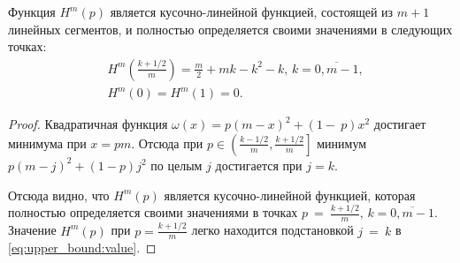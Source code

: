 \begin{lemma}
\label{lemma:upper_bound:function}
Функция $ H^m(p) $ является кусочно-линейной функцией, состоящей из $ m + 1 $ линейных сегментов, и полностью определяется своими значениями в следующих точках:
\begin{eqnarray*}
& H^m\left(\frac{k+1/2}{m}\right) 
    = \frac{m}{2} + mk - k^2 - k, 
        \, k = \overline{0, m - 1},\\
& H^m(0) = H^m(1) = 0.
\end{eqnarray*}
\end{lemma}
\begin{proof}
Квадратичная функция $ \omega(x) = p(m-x)^2 + (1-~p)x^2 $ достигает минимума при $ x = pm $. 
Отсюда при $ p \in \left( \frac{k - 1/2}{m}, \frac{k+1/2}{m} \right] $ минимум $ p(m-j)^2 + (1-p)j^2 $ по целым $ j $ достигается при $ j = k $.
 
Отсюда видно, что $ H^m(p) $ является кусочно-линейной функцией, которая полностью определяется своими значениями в точках $ p~=~\frac{k+1/2}{m}, \, k = \overline{0, m-1} $. 
Значение $ H^m(p) $ при $ p = \frac{k+1/2}{m} $ легко находится подстановкой $ j~=~k $ в \eqref{eq:upper_bound:value}.
\end{proof}